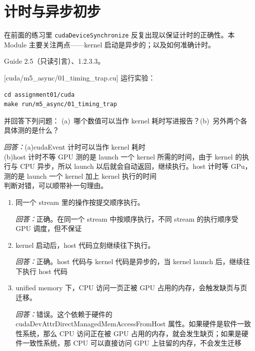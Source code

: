 \documentclass[11pt,a4paper,fontset=none]{ctexart}
\begin{document}
\section{计时与异步初步}

在前面的练习里 \texttt{cudaDeviceSynchronize} 反复出现以保证计时的正确性。本 Module 主要关注两点——kernel 启动是异步的；以及如何准确计时。

\begin{reading}
Guide 2.5（只读引言）、1.2.3.3。
\end{reading}

[cuda/m5\_async/01\_timing\_trap.cu]
运行实验：

\begin{lstlisting}
cd assignment01/cuda
make run/m5_async/01_timing_trap
\end{lstlisting}

并回答下列问题：
(a)~哪个数值可以当作 kernel 耗时写进报告？(b)~另外两个各具体测的是什么？
\par\noindent\textit{回答：}(a)cudaEvent 计时可以当作 kernel 耗时\\
(b)host 计时不等 GPU 测的是 launch 一个 kernel 所需的时间，由于 kernel 的执行与 CPU 异步，所以 launch 以后就会自动返回，继续执行。host 计时等 GPu，测的是 launch 一个 kernel 加上 kernel 执行的时间\\

判断对错，可以顺带补一句理由。
\begin{enumerate}[label=(\alph*)]
  \item 同一个 stream 里的操作按提交顺序执行。
  \par\noindent\textit{回答：}正确。在同一个 stream 中按顺序执行，不同 stream 的执行顺序受 GPU 调度，但不保证
  \item kernel 启动后，host 代码立刻继续往下执行。
  \par\noindent\textit{回答：}正确。host 代码与 kernel 代码是异步的，当 kernel launch 后，继续往下执行 host 代码
  \item unified memory 下，CPU 访问一页正被 GPU 占用的内存，会触发缺页与页迁移。
  \par\noindent\textit{回答：}错误。这个依赖于硬件的 cudaDevAttrDirectManagedMemAccessFromHost 属性。如果硬件是软件一致性系统，那么 CPU 访问正在被 GPU 占用的内存，就会发生缺页；如果是硬件一致性系统，那 CPU 可以直接访问 GPU 上驻留的内存，不会发生迁移
\end{enumerate}
\end{document}
